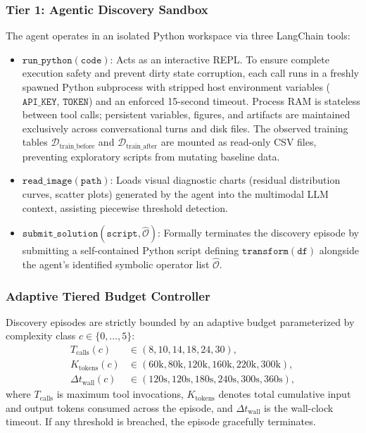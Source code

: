 \documentclass[sigconf]{acmart}
\begin{document}
\subsubsection{Tier 1: Agentic Discovery Sandbox}
The agent operates in an isolated Python workspace via three LangChain tools:
\begin{itemize}
    \item $\texttt{run\_python}(\texttt{code})$: Acts as an interactive REPL. To ensure complete execution safety and prevent dirty state corruption, each call runs in a freshly spawned Python subprocess with stripped host environment variables ($\texttt{API\_KEY}$, $\texttt{TOKEN}$) and an enforced 15-second timeout. Process RAM is stateless between tool calls; persistent variables, figures, and artifacts are maintained exclusively across conversational turns and disk files. The observed training tables $\mathcal{D}_{\text{train\_before}}$ and $\mathcal{D}_{\text{train\_after}}$ are mounted as read-only CSV files, preventing exploratory scripts from mutating baseline data.
    \item $\texttt{read\_image}(\texttt{path})$: Loads visual diagnostic charts (residual distribution curves, scatter plots) generated by the agent into the multimodal LLM context, assisting piecewise threshold detection.
    \item $\texttt{submit\_solution}(\texttt{script}, \widehat{\mathcal{O}})$: Formally terminates the discovery episode by submitting a self-contained Python script defining $\texttt{transform}(\texttt{df})$ alongside the agent's identified symbolic operator list $\widehat{\mathcal{O}}$.
\end{itemize}

\subsubsection{Adaptive Tiered Budget Controller}
Discovery episodes are strictly bounded by an adaptive budget parameterized by complexity class $c \in \{0, \dots, 5\}$:
\begin{align}
    T_{\text{calls}}(c) &\in (8, 10, 14, 18, 24, 30), \\
    K_{\text{tokens}}(c) &\in (60\text{k}, 80\text{k}, 120\text{k}, 160\text{k}, 220\text{k}, 300\text{k}), \\
    \Delta t_{\text{wall}}(c) &\in (120\text{s}, 120\text{s}, 180\text{s}, 240\text{s}, 300\text{s}, 360\text{s}),
\end{align}
where $T_{\text{calls}}$ is maximum tool invocations, $K_{\text{tokens}}$ denotes total cumulative input and output tokens consumed across the episode, and $\Delta t_{\text{wall}}$ is the wall-clock timeout. If any threshold is breached, the episode gracefully terminates.
\end{document}
